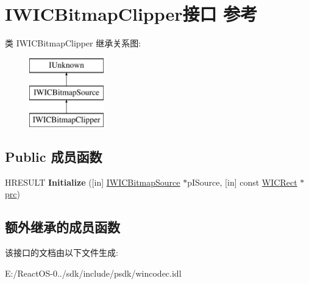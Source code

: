 \hypertarget{interface_i_w_i_c_bitmap_clipper}{}\section{I\+W\+I\+C\+Bitmap\+Clipper接口 参考}
\label{interface_i_w_i_c_bitmap_clipper}
类 I\+W\+I\+C\+Bitmap\+Clipper 继承关系图\+:\begin{figure}[H]
\begin{center}
\leavevmode
\includegraphics[height=3.000000cm]{interface_i_w_i_c_bitmap_clipper}
\end{center}
\end{figure}
\subsection*{Public 成员函数}
\begin{DoxyCompactItemize}
\item 
\mbox{\label{interface_i_w_i_c_bitmap_clipper_ac180c8b8a486ffa37f2433a3fcfb4d54}} 
H\+R\+E\+S\+U\+LT {\bfseries Initialize} (\mbox{[}in\mbox{]} \hyperlink{interface_i_w_i_c_bitmap_source}{I\+W\+I\+C\+Bitmap\+Source} $\ast$p\+I\+Source, \mbox{[}in\mbox{]} const \hyperlink{struct_w_i_c_rect}{W\+I\+C\+Rect} $\ast$\hyperlink{structtag_r_e_c_t}{prc})
\end{DoxyCompactItemize}
\subsection*{额外继承的成员函数}


该接口的文档由以下文件生成\+:\begin{DoxyCompactItemize}
\item 
E\+:/\+React\+O\+S-\/0../sdk/include/psdk/wincodec.\+idl\end{DoxyCompactItemize}
